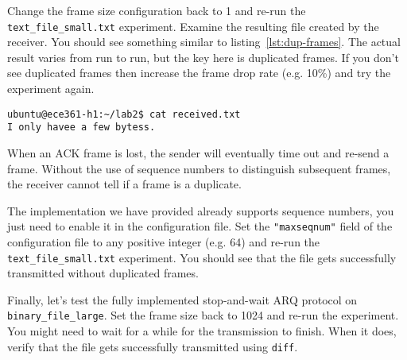 \documentclass[11pt]{article}
\begin{document}
Change the frame size configuration back to 1 and re-run the \texttt{text\_file\_small.txt} experiment.
Examine the resulting file created by the receiver. You should see something similar to listing~\ref{lst:dup-frames}.
The actual result varies from run to run, but the key here is duplicated frames.
If you don't see duplicated frames then increase the frame drop rate (e.g. 10\%) and try the experiment again.

\begin{lstlisting}[style=ece361-shell-base, caption={Example of duplicate frames being received.}, label={lst:dup-frames}]
ubuntu@ece361-h1:~/lab2$ cat received.txt
I only havee a few bytess.
\end{lstlisting}


When an ACK frame is lost, the sender will eventually time out and re-send a frame.
Without the use of sequence numbers to distinguish subsequent frames, the receiver cannot tell if a frame is a duplicate.

The implementation we have provided already supports sequence numbers, you just need to enable it in the configuration file.
Set the \texttt{"maxseqnum"} field of the configuration file to any positive integer (e.g. 64) and re-run the \texttt{text\_file\_small.txt} experiment.
You should see that the file gets successfully transmitted without duplicated frames.

Finally, let's test the fully implemented stop-and-wait ARQ protocol on \texttt{binary\_file\_large}. Set the frame size back to 1024 and re-run the experiment.
You might need to wait for a while for the transmission to finish. When it does, verify that the file gets successfully transmitted using \texttt{diff}.
\end{document}
